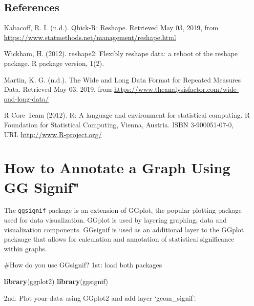 \documentclass[]{book}
\newenvironment{Shaded}{\begin{snugshade}}{\end{snugshade}}
\newcommand{\KeywordTok}[1]{\textcolor[rgb]{0.13,0.29,0.53}{\textbf{#1}}}
\newcommand{\NormalTok}[1]{#1}
\begin{document}
\hypertarget{references}{%
\section{References}\label{references}}

Kabacoff, R. I. (n.d.). Qhick-R: Reshape. Retrieved May 03, 2019, from \url{https://www.statmethods.net/management/reshape.html}

Wickham, H. (2012). reshape2: Flexibly reshape data: a reboot of the reshape package. R package version, 1(2).

Martin, K. G. (n.d.). The Wide and Long Data Format for Repeated Measures Data. Retrieved May 03, 2019, from \url{https://www.theanalysisfactor.com/wide-and-long-data/}

R Core Team (2012). R: A language and environment for statistical computing. R Foundation for Statistical Computing, Vienna, Austria. ISBN 3-900051-07-0, URL \url{http://www.R-project.org/}

\hypertarget{how-to-annotate-a-graph-using-gg-signif}{%
\chapter{How to Annotate a Graph Using GG Signif"}\label{how-to-annotate-a-graph-using-gg-signif}}

The \texttt{ggsignif} package is an extension of GGplot, the popular plotting package used for data visualization. GGplot is used by layering graphing, data and visualization components. GGsignif is used as an additional layer to the GGplot packaage that allows for calculation and annotation of statistical significance within graphs.

\#How do you use GGsignif?
1st: load both packages

\begin{Shaded}
\begin{Highlighting}[]
\KeywordTok{library}\NormalTok{(ggplot2)}
\KeywordTok{library}\NormalTok{(ggsignif)}
\end{Highlighting}
\end{Shaded}

2nd: Plot your data using GGplot2 and add layer `geom\_signif'.
\end{document}
